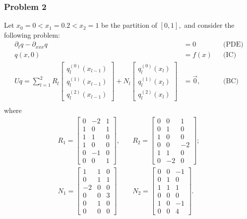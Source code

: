 \documentclass[11pt,reqno,oneside,a4paper]{article}
\theoremstyle{plain} %
\theoremstyle{definition}
\theoremstyle{remark}
\begin{document}
\subsubsection*{Problem 2}
Let $x_0 = 0 < x_1  = 0.2 < x_2 = 1$ be the partition of $[0,1],$ and consider the following problem:
\begin{align*}
\partial_t q - \partial_{xxx} q &= 0 &&\text{(PDE)} \\
q(x, 0) &= f(x) &&\text{(IC)} \\
Uq = \sum^2_{l=1} R_l \begin{bmatrix} q_l^{(0)}(x_{l-1}) \\ q_l^{(1)}(x_{l-1}) \\ q_l^{(2)}(x_{l-1})  \end{bmatrix} + N_l \begin{bmatrix} q_l^{(0)}(x_{l}) \\ q_l^{(1)}(x_{l}) \\ q_l^{(2)}(x_{l}) \end{bmatrix} &= \vec{0}, &&\text{(BC)} \\
\end{align*}
where 
\begin{equation*}
\begin{aligned}
R_1 = \begin{bmatrix} 0 & -2 & 1 \\ 1 & 0 & 1 \\ 1 & 1 & 0 \\ 1 & 0 & 0 \\ 0 & -1 & 0 \\ 0 & 0 & 1 \end{bmatrix}, &\quad R_2= \begin{bmatrix} 0 & 0 & 1 \\ 0 & 1 & 0 \\ 1 & 0 & 0 \\ 0 & 0 & -2 \\ 1 & 1 & 0 \\ 0 & -2 & 0 \end{bmatrix}; \\
N_1 =\begin{bmatrix} 1 & 1 & 0 \\ 0 & 1 & 1 \\ -2 & 0 & 0 \\ 0 & 0 & 3 \\ 0 & 1 & 0 \\ 0 & 0 & 0 \end{bmatrix} &\quad N_2 = \begin{bmatrix} 0 & 0 & -1 \\ 0 & 1 & 0 \\ 1 & 1 & 1 \\ 0 & 0 & 0 \\ 1 & 0 & -1 \\ 0 & 0 & 4 \end{bmatrix}. 
\end{aligned}
\end{equation*}
\end{document}
